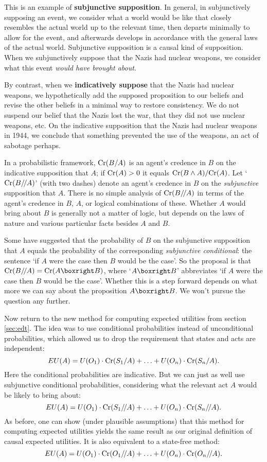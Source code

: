 This is an example of \textbf{subjunctive supposition}. In general,
in subjunctively supposing an event, we consider what a world would
be like that closely resembles the actual world up to the relevant
time, then departs minimally to allow for the event, and afterwards
develops in accordance with the general laws of the actual world.
Subjunctive supposition is a causal kind of supposition. When
we subjunctively suppose that the Nazis had nuclear weapons, we
consider what this event \emph{would have brought about}.

By contrast, when we \textbf{indicatively suppose} that the Nazis had
nuclear weapons, we hypothetically add the supposed proposition to our
beliefs and revise the other beliefs in a minimal way to restore
consistency. We do not suspend our belief that the Nazis lost the war,
that they did not use nuclear weapons, etc. On the indicative
supposition that the Nazis had nuclear weapons in 1944, we conclude
that something prevented the use of the weapons, an act of sabotage
perhaps.

In a probabilistic framework, $\text{Cr}(B/A)$ is an agent's credence in $B$
on the indicative supposition that $A$; if $\text{Cr}(A)>0$ it equals
$\text{Cr}(B \land A)/\text{Cr}(A)$. Let `$\text{Cr}(B/\!/A)$' (with two dashes) denote
an agent's credence in $B$ on the \emph{subjunctive} supposition that
$A$. There is no simple analysis of $\text{Cr}(B/\!/A)$ in terms of the
agent's credence in $B$, $A$, or logical combinations of these.
Whether $A$ would bring about $B$ is generally not a matter of logic,
but depends on the laws of nature and various particular facts besides
$A$ and $B$.

Some have suggested that the probability of $B$ on the subjunctive
supposition that $A$ equals the probability of the corresponding
\emph{subjunctive conditional}: the sentence `if $A$ were the case
then $B$ would be the case'. So the proposal is that
$\Cr(B/\!/A) = \Cr(A \boxright B)$, where `$A \boxright B$'
abbreviates `if $A$ were the case then $B$ would be the case'. Whether
this is a step forward depends on what more we can say about the
proposition $A \boxright B$. We won't pursue the question any further.

Now return to the new method for computing expected utilities from
section \ref{sec:edt}. The idea was to use conditional probabilities
instead of unconditional probabilities, which allowed us to drop the
requirement that states and acts are independent:
\[
EU(A) = U(O_1) \cdot \text{Cr}(S_1/A) + \ldots + U(O_n) \cdot \text{Cr}(S_n/A).
\]
Here the conditional probabilities are indicative. But we can just
as well use subjunctive conditional probabilities, considering what
the relevant act $A$ would be likely to bring about:
\[
EU(A) = U(O_1) \cdot \text{Cr}(S_1/\!/A) + \ldots + U(O_n) \cdot \text{Cr}(S_n/\!/A).
\]
As before, one can show (under plausible assumptions) that this method
for computing expected utilities yields the same result as our
original definition of causal expected utilities. It is also
equivalent to a state-free method:
\[
EU(A) = U(O_1) \cdot \text{Cr}(O_1/\!/A) + \ldots + U(O_n) \cdot \text{Cr}(O_n/\!/A).
\]


